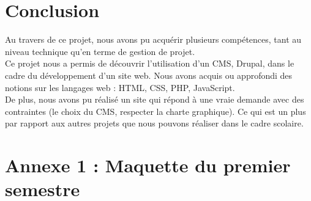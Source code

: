 \documentclass[11pt]{report}
\begin{document}

\section{Conclusion}

Au travers de ce projet, nous avons pu acquérir plusieurs compétences, tant au
niveau technique qu'en terme de gestion de projet. \\
Ce projet nous a permis de découvrir l'utilisation d'un CMS, Drupal, dans le cadre du
développement d'un site web. Nous avons acquis ou approfondi des notions sur les
langages web : HTML, CSS, PHP, JavaScript. \\
De plus, nous avons pu réalisé un site qui répond à une vraie demande avec des
contraintes (le choix du CMS, respecter la charte graphique). Ce qui est un
plus par rapport aux autres projets que nous pouvons réaliser dans le cadre scolaire. \\


\newpage

\section*{Annexe 1 : Maquette du premier semestre}
\end{document}
